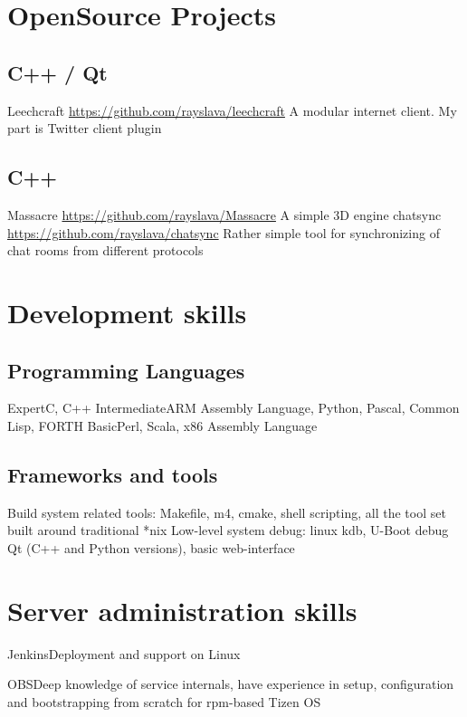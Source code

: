 \documentclass[11pt,a4paper]{moderncv}
\begin{document}
\section{OpenSource Projects}
\subsection{C++ / Qt}
\cvitem
  {Leechcraft}
  {\url{https://github.com/rayslava/leechcraft}\newline{}
  A modular internet client. My part is Twitter client plugin}
\subsection{C++}
\cvitem
  {Massacre}
  {\url{https://github.com/rayslava/Massacre}\newline{}
  A simple 3D engine}
\cvitem
  {chatsync}
  {\url{https://github.com/rayslava/chatsync}\newline{}
  Rather simple tool for synchronizing of chat rooms from different protocols}

\section{Development skills}
\subsection{Programming Languages}
\cvitem
  {Expert}{C, C++}
\cvitem
  {Intermediate}{ARM Assembly Language, Python, Pascal, Common Lisp, FORTH}
\cvitem
  {Basic}{Perl, Scala, x86 Assembly Language}

\subsection{Frameworks and tools}
{Build system related tools: Makefile, m4, cmake, shell scripting, all the tool set built around traditional *nix}
{Low-level system debug: linux kdb, U-Boot debug}
{Qt (C++ and Python versions), basic web-interface}

\section{Server administration skills}
\cvitem
  {Jenkins}{Deployment and support on Linux}

\cvitem
  {OBS}{Deep knowledge of service internals, have experience in setup, configuration and bootstrapping from
    scratch for rpm-based Tizen OS}
\end{document}
